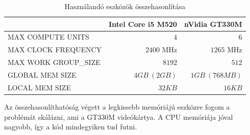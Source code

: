 	\begin{table}[!ht]
	\renewcommand{\arraystretch}{1.3}
	\setlength{\extrarowheight}{8pt}
	\caption{Használandó eszközök összehasonlítása}
	\label{table:envs}
	\centering
	\footnotesize
	
	\begin{tabular}{ l | r | r}
		 & Intel Core i5 M520 & nVidia GT330M \\ \hline
		MAX COMPUTE UNITS & $4$ & $6$\\
		MAX CLOCK FREQUENCY & $2400$ MHz & $1265$ MHz \\
		MAX WORK GROUP\_SIZE & $8192$ & $512$ \\ \hline\hline
		GLOBAL MEM SIZE & $4GB\ (2GB)$ & $1GB\ (768 MB)$\\
		LOCAL MEM SIZE & $32 KB$ & $16 KB$\\
	\end{tabular}
	\end{table}
	
	Az összehasonlíthatóság végett a legkissebb memóriájú eszközre fogom a problémát skálázni, ami a
	GT330M videókártya. A CPU memóriája jóval nagyobb, így a kód mindegyiken tud futni.




